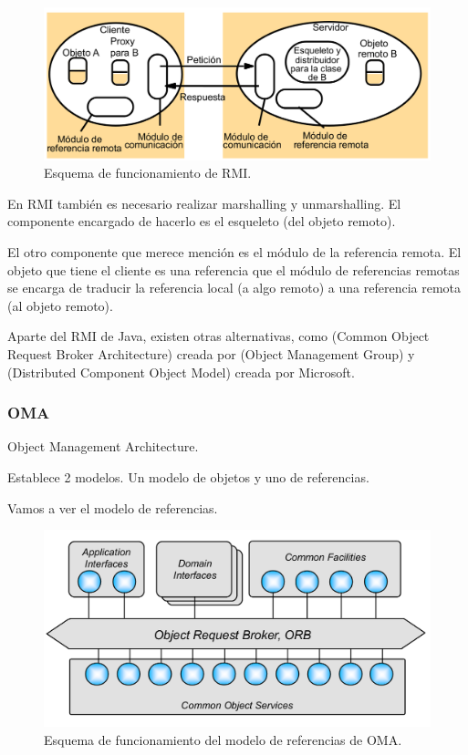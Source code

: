 \begin{figure}[hbtp]
\centering
\includegraphics[width=1\textwidth]{img/RMI.png}
\caption{Esquema de funcionamiento de RMI.}
\label{RMI}
\end{figure}

En RMI también es necesario realizar marshalling y unmarshalling. El componente encargado de hacerlo es el esqueleto (del objeto remoto).

El otro componente que merece mención es el módulo de la referencia remota. El objeto que tiene el cliente es una referencia que el módulo de referencias remotas se encarga de traducir la referencia local (a algo remoto) a una referencia remota (al objeto remoto).

Aparte del RMI de Java, existen otras alternativas, como  (Common Object Request Broker Architecture) creada por  (Object Management Group) y  (Distributed Component Object Model) creada por Microsoft.

\subsubsection{OMA}
\begin{defn}[OMA]
Object Management Architecture.

Establece 2 modelos. Un modelo de objetos y uno de referencias.
\end{defn}

Vamos a ver el modelo de referencias.


\begin{figure}[hbtp]
\centering
\includegraphics[width=1\textwidth]{img/OMA_Ref.png}
\caption{Esquema de funcionamiento del modelo de referencias de OMA.}
\label{OMA}
\end{figure}

